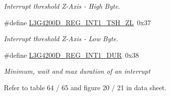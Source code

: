 \begin{DoxyCompactItemize}
\begin{DoxyCompactList}\small\item\em \-Interrupt threshold \-Z-\/\-Axis -\/ \-High \-Byte. \end{DoxyCompactList}\item 
\hypertarget{group___l3_g4200_d___r_e_g_i_s_t_e_r_s_ga3c3fdeb7fa49f05de2a2fb472e8eba3a}{\#define \hyperlink{group___l3_g4200_d___r_e_g_i_s_t_e_r_s_ga3c3fdeb7fa49f05de2a2fb472e8eba3a}{\-L3\-G4200\-D\-\_\-\-R\-E\-G\-\_\-\-I\-N\-T1\-\_\-\-T\-S\-H\-\_\-\-Z\-L}~0x37}\label{group___l3_g4200_d___r_e_g_i_s_t_e_r_s_ga3c3fdeb7fa49f05de2a2fb472e8eba3a}

\begin{DoxyCompactList}\small\item\em \-Interrupt threshold \-Z-\/\-Axis -\/ \-Low \-Byte. \end{DoxyCompactList}\item 
\hypertarget{group___l3_g4200_d___r_e_g_i_s_t_e_r_s_gad997d1412246e223d6410a1edbee7975}{\#define \hyperlink{group___l3_g4200_d___r_e_g_i_s_t_e_r_s_gad997d1412246e223d6410a1edbee7975}{\-L3\-G4200\-D\-\_\-\-R\-E\-G\-\_\-\-I\-N\-T1\-\_\-\-D\-U\-R}~0x38}\label{group___l3_g4200_d___r_e_g_i_s_t_e_r_s_gad997d1412246e223d6410a1edbee7975}

\begin{DoxyCompactList}\small\item\em \-Minimum, wait and max duration of an interrupt\par
 \-Refer to table 64 / 65 and figure 20 / 21 in data sheet. \end{DoxyCompactList}\end{DoxyCompactItemize}
